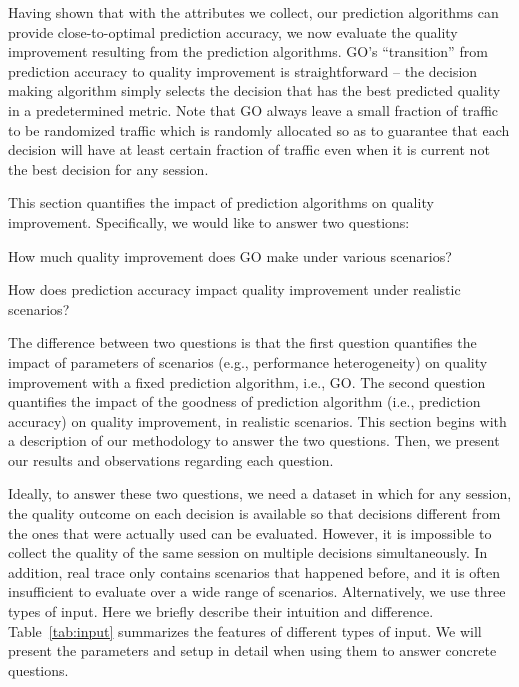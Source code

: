 \label{improvement}
Having shown that with the attributes we collect, our prediction algorithms can provide close-to-optimal prediction accuracy, we now evaluate the quality improvement resulting from the prediction algorithms. GO's ``transition'' from prediction accuracy to quality improvement is straightforward -- the decision making algorithm simply selects the decision that has the best predicted quality in a predetermined metric. Note that GO always leave a small fraction of traffic to be randomized traffic which is randomly allocated so as to guarantee that each decision will have at least certain fraction of traffic even when it is current not the best decision for any session.

This section quantifies the impact of prediction algorithms on quality improvement. Specifically, we would like to answer two questions:
\begin{packedenumerate}
	\item How much quality improvement does GO make under various scenarios?
	\item How does prediction accuracy impact quality improvement under realistic scenarios?
\end{packedenumerate}

The difference between two questions is that the first question quantifies the impact of parameters of scenarios (e.g., performance heterogeneity) on quality improvement with a fixed prediction algorithm, i.e., GO. The second question quantifies the impact of the goodness of prediction algorithm (i.e., prediction accuracy) on quality improvement, in realistic scenarios. This section begins with a description of our methodology to answer the two questions. Then, we present our results and observations regarding each question.

Ideally, to answer these two questions, we need a dataset in which for any session, the quality outcome on each decision is available so that decisions different from the ones that were actually used can be evaluated. However, it is impossible to collect the quality of the same session on multiple decisions simultaneously. In addition, real trace only contains scenarios that happened before, and it is often insufficient to evaluate over a wide range of scenarios.
Alternatively, we use three types of input. Here we briefly describe their intuition and difference. Table~\ref{tab:input} summarizes the features of different types of input. We will present the parameters and setup in detail when using them to answer concrete questions.

